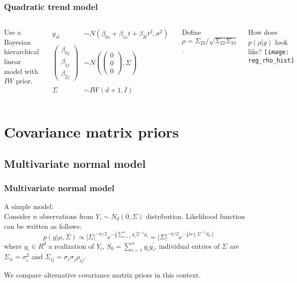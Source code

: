 \documentclass[9pt]{beamer}\usepackage[]{graphicx}\usepackage[]{color}
\begin{document}
\begin{frame}
\frametitle{Quadratic trend model}
  \begin{columns}[T] %


Use a Bayesian hierarchical linear model with $IW$ prior. 

\[\begin{array}{cl}
y_{st}  & \sim  N(\beta_{0s} + \beta_{1s} t + \beta_{2t}t^2, \sigma^2) \\
& \\
\begin{pmatrix} \beta_{0j} \\ \beta_{1j} \\ \beta_{2j} \end{pmatrix} & \sim  N \left( \begin{pmatrix} 0 \\ 0 \\ 0 \end{pmatrix} , \Sigma \right) \\
& \\
\Sigma & \sim  IW(d+1, I)
\end{array}
\]

Define $\rho = \Sigma_{23}/\sqrt{\Sigma_{22}\Sigma_{33}}$. 

  \pause
  How does $p(\rho| y)$ look like?
    \texttt{[image: reg\_rho\_hist]}
  \end{columns}
\end{frame}
\section{Covariance matrix priors}

\subsection{Multivariate normal model } 
\begin{frame}
\frametitle{Multivariate normal model }
A simple model: \\
Consider $n$ observations from $Y_i \sim N_d(0, \Sigma)$ distribution. Likelihood function can be written as follows: 
\[
p(y\vert \mu,\Sigma) \propto |\Sigma|^{-n/2} e^{- \frac{1}{2} \sum_{i=1}^n y_i^{'} \Sigma^{-1} y_i  } = |\Sigma|^{-n/2} e^{- \frac{1}{2}  tr(\Sigma^{-1}S_0)  } 
 \]
where $y_i \in R^d$ a realization of $Y_i$,  $S_0=\sum_{i=1}^n y_i y_i ^{'}$, individual entries of $\Sigma$ are $\Sigma_{ii} = \sigma_i^2$ and $\Sigma_{ij} = \sigma_i\sigma_j\rho_{ij}$. 

We compare alternative covariance matrix priors in this context.
\end{frame}
\end{document}
